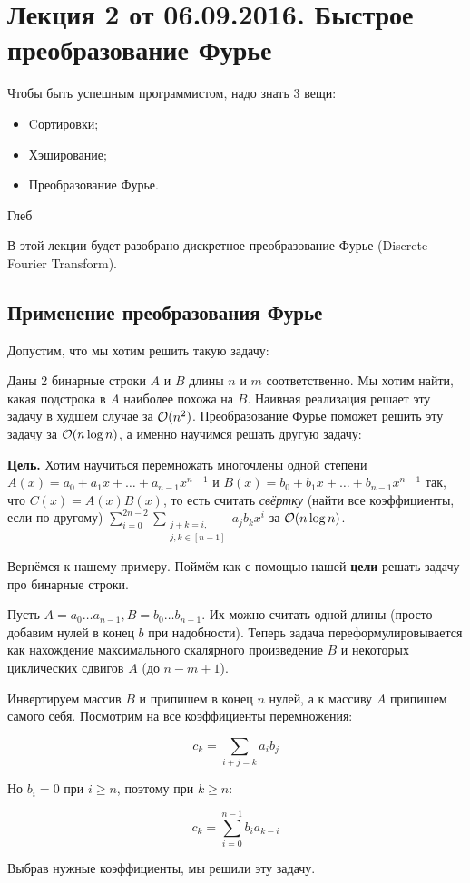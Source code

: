 

% 

\section{Лекция 2 от 06.09.2016. Быстрое преобразование Фурье}
\epigraph{Чтобы быть успешным программистом, надо знать 3 вещи: 
\begin{itemize}
\item Cортировки;
\item Хэширование;
\item Преобразование Фурье.
\end{itemize}
\leavevmode}{Глеб}

В этой лекции будет разобрано дискретное преобразование Фурье (Discrete Fourier
Transform).

\subsection{Применение преобразования Фурье}

Допустим, что мы хотим решить такую задачу:

\begin{Examples}
  Даны 2 бинарные строки $A$ и $B$ длины $n$ и $m$ соответственно. Мы хотим найти, какая подстрока в $A$ наиболее
  похожа на $B$. Наивная реализация решает эту задачу в худшем случае за
  $\mathcal{O}(n^2)$. Преобразование
  Фурье поможет решить эту задачу за $\mathcal{O}(n\log n)$, а именно научимся решать другую
  задачу:

{\bf Цель.}
  Хотим научиться перемножать многочлены одной степени \newline $A(x) = a_0 + a_1x + \ldots + a_{n - 1}x^{n - 1}$
  и $B(x) = b_0 + b_1x + \ldots + b_{n - 1}x^{n - 1}$ так, что 
  $C(x) = A(x)B(x)$, то есть считать \textit{свёртку} (найти все коэффициенты, если по-другому) 
  $\sum\limits_{i = 0}^{2n - 2} \sum\limits_{\substack{j + k = i,\\
  j, k \in [n - 1]}} a_jb_{k}x^i$ за $\mathcal{O}(n\log n)$.

Вернёмся к нашему примеру. Поймём как с помощью нашей {\bf цели} решать задачу
про бинарные строки.

Пусть $A = a_0 \ldots a_{n - 1}, B = b_0\ldots b_{n - 1}$. Их можно считать одной длины
(просто добавим нулей в конец $b$ при надобности). Теперь задача 
переформулировывается как нахождение максимального скалярного произведение
$B$ и некоторых циклических сдвигов $A$ (до $n - m + 1$).

Инвертируем массив $B$ и припишем в конец $n$ нулей, а к массиву
$A$ припишем самого себя. Посмотрим на все коэффициенты перемножения:

\[
  c_k = \sum\limits_{i + j = k} a_ib_j
\]

Но $b_i = 0$ при $i \geqslant n$, поэтому при $k \geqslant n$:

\[
  c_k = \sum\limits_{i = 0}^{n - 1} b_ia_{k - i}
\]

Выбрав нужные коэффициенты, мы решили эту задачу.

\end{Examples}

